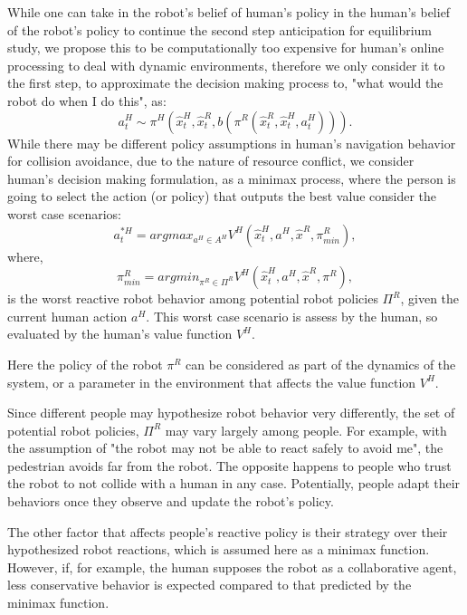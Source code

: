 \documentclass{article}
\begin{document}
While one can take in the robot's belief of human's policy in the human's belief of the robot's policy to continue the second step anticipation for equilibrium study, we propose this to be computationally too expensive for human's online processing to deal with dynamic environments, therefore we only consider it to the first step, to approximate the decision making process to, "what would the robot do when I do this", as:
\begin{equation}
a^H_t \sim \pi^H (\hat{x}^H_t, \hat{x}^R_t, b(\pi^R (\hat{x}^R_t, \hat{x}^H_t,a^H_t ))).
\end{equation}
While there may be different policy assumptions in human's navigation behavior for collision avoidance, due to the nature of resource conflict, we consider human's decision making formulation, as a minimax process, where the person is going to select the action (or policy) that outputs the best value consider the worst case scenarios:
\begin{equation}
a^{*H}_t = argmax_{a^H \in A^H} V^H(\hat{x}^H_t, a^H ,\hat{x}^R,\pi^R_{min}),
\end{equation}
where,
\begin{equation}
    \pi^R_{min} = argmin_{\pi^R \in \Pi^R} V^H(\hat{x}^H_t,a^H, \hat{x}^R, \pi^R),
\end{equation}
is the worst reactive robot behavior among potential robot policies $\Pi^R$, given the current human action $a^H$. This worst case scenario is assess by the human, so evaluated by the human's value function $V^H$. 

Here the policy of the robot $\pi^R$ can be considered as part of the dynamics of the system, or a parameter in the environment that affects the value function $V^H$. 

Since different people may hypothesize robot behavior very differently, the set of potential robot policies, $\Pi^R$ may vary largely among people. For example, with the assumption of "the robot may not be able to react safely to avoid me", the pedestrian avoids far from the robot. The opposite happens to people who trust the robot to not collide with a human in any case. Potentially, people adapt their behaviors once they observe and update the robot's policy. 

The other factor that affects people's reactive policy is their strategy over their hypothesized robot reactions, which is assumed here as a minimax function. However, if, for example, the human supposes the robot as a collaborative agent, less conservative behavior is expected compared to that predicted by the minimax function.
\end{document}
